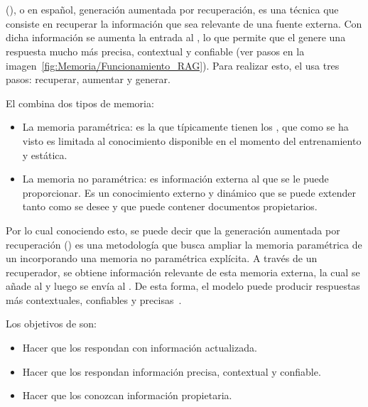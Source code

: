 \section{}
 (), o en español, generación aumentada por recuperación, es una técnica que consiste en recuperar la información que sea relevante de una fuente externa. Con dicha información se aumenta la entrada al , lo que permite que el  genere una respuesta mucho más precisa, contextual y confiable (ver pasos en la imagen~\ref{fig:Memoria/Funcionamiento_RAG}). Para realizar esto, el  usa tres pasos: recuperar, aumentar y generar. 


El  combina dos tipos de memoria:
\begin{itemize}
\tightlist
	\item La memoria paramétrica: es la que típicamente tienen los , que como se ha visto es limitada al conocimiento disponible en el momento del entrenamiento y estática. 
	\item La memoria no paramétrica: es información externa al  que se le puede proporcionar. Es un conocimiento externo y dinámico que se puede extender tanto como se desee y que puede contener documentos propietarios.
\end{itemize}

Por lo cual conociendo esto, se puede decir que la generación aumentada por recuperación () es una metodología que busca ampliar la memoria paramétrica de un  incorporando una memoria no paramétrica explícita. A través de un recuperador, se obtiene información relevante de esta memoria externa, la cual se añade al  y luego se envía al . De esta forma, el modelo puede producir respuestas más contextuales, confiables y precisas~\cite{book:RAG_SimpleGuide}.

Los objetivos de  son:
\begin{itemize}
\tightlist
	\item Hacer que los  respondan con información actualizada.
	\item Hacer que los  respondan información precisa, contextual y confiable.
	\item Hacer que los  conozcan información propietaria.
\end{itemize}

